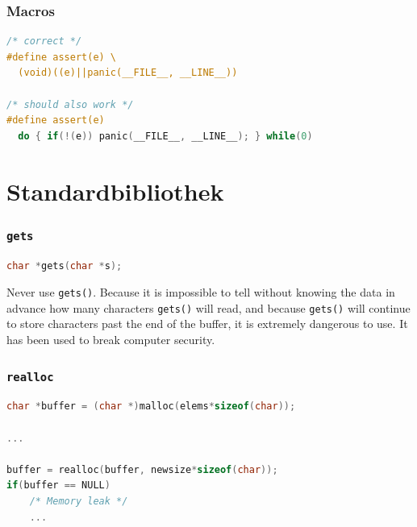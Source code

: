 \documentclass[12pt,compress]{beamer}
\begin{document}
\begin{frame}[fragile]
\frametitle{Macros}

\begin{lstlisting}[language=C,basicstyle=\ttfamily\small,keywordstyle=\color{red}]
/* correct */
#define assert(e) \
  (void)((e)||panic(__FILE__, __LINE__))

/* should also work */
#define assert(e)
  do { if(!(e)) panic(__FILE__, __LINE__); } while(0)
\end{lstlisting}
\end{frame}

\section{Standardbibliothek}


\begin{frame}[fragile]
\frametitle{\texttt{gets}}

\begin{lstlisting}[language=C,basicstyle=\ttfamily\small,keywordstyle=\color{red}]
char *gets(char *s);
\end{lstlisting}

\vfill

Never use \texttt{gets()}.  Because it is impossible to tell without knowing
the data in advance how many characters \texttt{gets()} will read, and because
\texttt{gets()} will continue to store characters past the end of the buffer,
it is extremely dangerous to use.  It has been used to break computer security.
\end{frame}

\begin{frame}[fragile]
\frametitle{\texttt{realloc}}

\begin{lstlisting}[language=C,basicstyle=\ttfamily\small,keywordstyle=\color{red}]
char *buffer = (char *)malloc(elems*sizeof(char));

...

buffer = realloc(buffer, newsize*sizeof(char));
if(buffer == NULL)
    /* Memory leak */
    ...
\end{lstlisting}
\end{frame}


\end{document}
